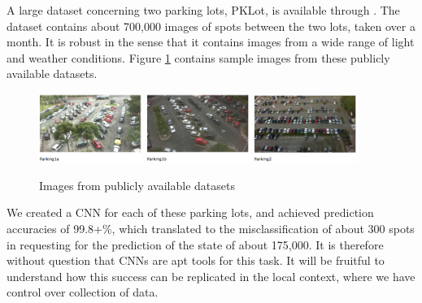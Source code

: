 \documentclass[]{article}
\let\rmarkdownfootnote\footnote%
\def\footnote{\protect\rmarkdownfootnote}
\begin{document}
A large dataset concerning two parking lots, PKLot, is available through
\cite{de2015pklot}. The dataset contains about 700,000 images of spots between
the two lots, taken over a month. It is robust in the sense that it contains
images from a wide range of light and weather conditions. Figure
\ref{fig:sample-pklot} contains sample images from these publicly available
datasets.

\begin{figure}[H]
  \centering
    \includegraphics[width=0.3\textwidth]{pklot_1a}
    \includegraphics[width=0.3\textwidth]{pklot_1b}
    \includegraphics[width=0.3\textwidth]{pklot_1c}
  \caption{Images from publicly available datasets}
  \label{fig:sample-pklot}
\end{figure}

We created a CNN for each of these parking lots, and achieved prediction
accuracies of 99.8+\%, which translated to the misclassification of
about 300 spots in requesting for the prediction of the state of about
175,000. It is therefore without question that CNNs are apt tools for
this task. It will be fruitful to understand how this success can be
replicated in the local context, where we have control over collection
of data.
\end{document}
